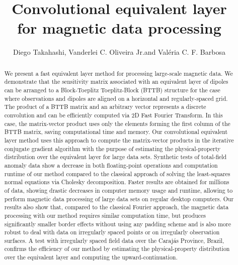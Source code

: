 \documentclass[manuscript,noblind]{geophysics}
\begin{document}
\title{Convolutional equivalent layer \\ for magnetic data processing}

\renewcommand{\thefootnote}{\fnsymbol{footnote}}

	
\address{
\footnotemark[1]Observatório Nacional, \\
77 General José Cristino St, \\
Rio de Janeiro, RJ, 20921-400 \\
}
\author{Diego Takahashi\footnotemark[1], Vanderlei C. Oliveira Jr.\footnotemark[1] and Valéria C. F. Barbosa\footnotemark[1]}

	
\maketitle
	
\begin{abstract}
		
We present a fast equivalent layer method for processing large-scale magnetic data. 
We demonstrate that the sensitivity matrix associated with an equivalent layer
of dipoles can be arranged to a Block-Toeplitz Toeplitz-Block (BTTB) structure for the 
case where observations and dipoles are aligned on a 
horizontal and regularly-spaced grid.
The product of a BTTB matrix and an arbitrary vector represents a discrete 
convolution and can be efficiently computed via 2D Fast Fourier Transform.
In this case, the matrix-vector product uses only the elements forming the first column
of the BTTB matrix, saving computational time and memory. 
Our convolutional equivalent layer method uses this approach to compute 
the matrix-vector products in the iterative conjugate gradient algorithm with the purpose 
of estimating the physical-property distribution over the equivalent layer for 
large data sets.
Synthetic tests of total-field anomaly data
show a decrease in both floating-point operations and computation runtime 
of our method compared to the classical approach of solving
the least-squares normal equations via Cholesky decomposition.
Faster results are obtained for millions of data, showing drastic decreases in computer memory usage
and runtime, allowing to perform magnetic data processing of large data sets on regular 
desktop computers. 
Our results also show that, compared to the classical Fourier approach, the magnetic
data processing with our method requires similar computation time, but produces significantly 
smaller border effects without using any padding scheme and is also more robust to 
deal with data on irregularly spaced points or on irregularly observation surfaces.
A test with irregularly spaced field data over the Caraj{\'a}s Province, Brazil, 
confirms the efficiency of our method by estimating the physical-property
distribution over the equivalent layer and computing the upward-continuation.
		
\end{abstract}
\end{document}
